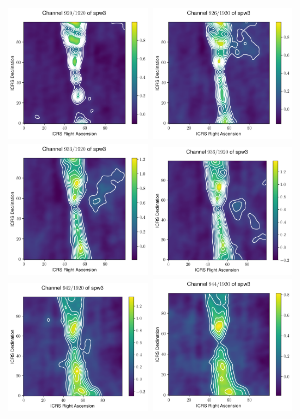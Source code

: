\documentclass[10pt]{article}
\begin{document}
\begin{figure}
\includegraphics[width=0.33\textwidth]{spw3_920}
\includegraphics[width=0.33\textwidth]{spw3_926}
\includegraphics[width=0.33\textwidth]{spw3_933}
\includegraphics[width=0.33\textwidth]{spw3_936}
\includegraphics[width=0.33\textwidth]{spw3_942}
\includegraphics[width=0.33\textwidth]{spw3_944}

\end{figure}
\end{document}
